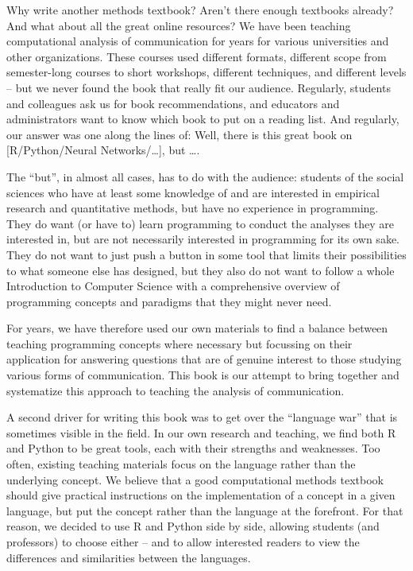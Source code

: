 Why write another methods textbook? Aren't there enough textbooks already? And what about all the great online resources?  We have been teaching computational analysis of communication for years for various universities and other organizations.  These courses used different formats, different scope from semester-long courses to short workshops, different techniques, and different levels -- but we never found the book that really fit our audience.  Regularly, students and colleagues ask us for book recommendations, and educators and administrators want to know which book to put on a reading list.  And regularly, our answer was one along the lines of: Well, there is this great book on [R/Python/Neural Networks/\ldots], but \ldots.

The ``but'', in almost all cases, has to do with the audience: students of the social sciences who have at least some knowledge of and are interested in empirical research and quantitative methods, but have no experience in programming. They do want (or have to) learn programming to conduct the analyses they are interested in, but are not necessarily interested in programming for its own sake.  They do not want to just push a button in some tool that limits their possibilities to what someone else has designed, but they also do not want to follow a whole Introduction to Computer Science with a comprehensive overview of programming concepts and paradigms that they might never need.

For years, we have therefore used our own materials to find a balance between teaching programming concepts where necessary but focussing on their application for answering questions that are of genuine interest to those studying various forms of communication.  This book is our attempt to bring together and systematize this approach to teaching the analysis of communication.

A second driver for writing this book was to get over the ``language war'' that is sometimes visible in the field. In our own research and teaching, we find both R and Python to be great tools, each with their strengths and weaknesses. Too often, existing teaching materials focus on the language rather than the underlying concept. We believe that a good computational methods textbook should give practical instructions on the implementation of a concept in a given language, but put the concept rather than the language at the forefront.  For that reason, we decided to use R and Python side by side, allowing students (and professors) to choose either -- and to allow interested readers to view the differences and similarities between the languages.

